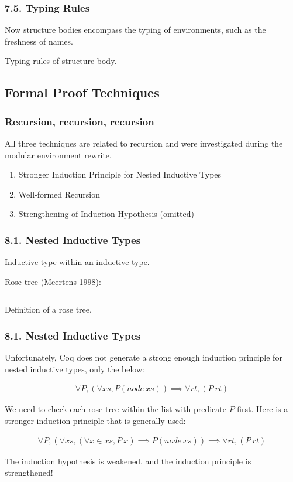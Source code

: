 \begin{frame}
  \frametitle{7.5. Typing Rules}
  Now structure bodies encompass the typing of environments, such as the
  freshness of names.
  \begin{listing}[H]
      \caption{Typing rules of structure body.}
    \end{listing}
\end{frame}

\subsection{Formal Proof Techniques}

\begin{frame}
  \frametitle{Recursion, recursion, recursion}
  
  All three techniques are related to recursion and were investigated during
  the modular environment rewrite.
  \begin{enumerate}
  \item Stronger Induction Principle for Nested Inductive Types
  \item Well-formed Recursion
  \item Strengthening of Induction Hypothesis (omitted)
  \end{enumerate}
\end{frame}

\begin{frame}
  \frametitle{8.1. Nested Inductive Types}
  Inductive type within an inductive type.

  Rose tree (Meertens 1998):

  \begin{listing}[H]
    \inputminted[firstline=1,lastline=2]{Coq}{code/machineries.v}
  \caption{Definition of a rose tree.}
  \end{listing}
\end{frame}

\begin{frame}
  \frametitle{8.1. Nested Inductive Types}

  Unfortunately, Coq does not generate a strong enough induction principle
  for nested inductive types, only the below:

\begin{align*}
  \forall P, (\forall xs, P (node\ xs)) \implies \forall rt, (P\ rt)
\end{align*}

We need to check each rose tree within the list with predicate $P$ first. \pause
Here is a stronger induction principle that is generally used:

\begin{align*}
  \forall P, (\forall xs, (\forall x\in xs, P\ x) \implies P (node\ xs))
   \implies \forall rt, (P\ rt)
\end{align*}

The induction hypothesis is weakened, and the induction principle is
strengthened!

\end{frame}

